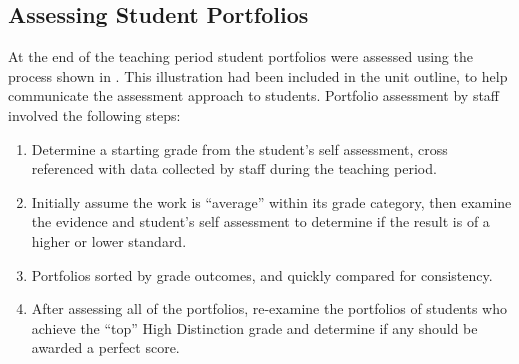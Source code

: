 

\subsection{Assessing Student Portfolios} %
\label{sub:assessing_student_portfolios}

At the end of the teaching period student portfolios were assessed using the process shown in . This illustration had been included in the unit outline, to help communicate the assessment approach to students. Portfolio assessment by staff involved the following steps:

\begin{enumerate}
	\item Determine a starting grade from the student's self assessment, cross referenced with data collected by staff during the teaching period.
	\item Initially assume the work is ``average'' within its grade category, then examine the evidence and student's self assessment to determine if the result is of a higher or lower standard.
	\item Portfolios sorted by grade outcomes, and quickly compared for consistency.
	\item After assessing all of the portfolios, re-examine the portfolios of students who achieve the ``top'' High Distinction grade and determine if any should be awarded a perfect score.
\end{enumerate}

